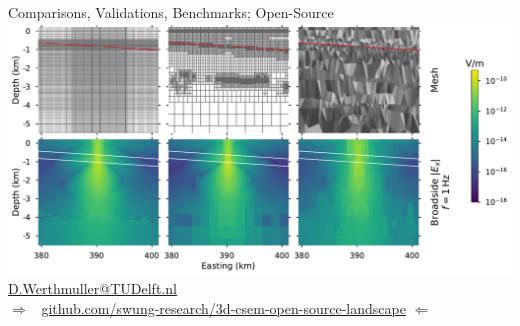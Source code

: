 \documentclass[xcolor=svgnames, aspectratio=169]{beamer}
\newcommand{\bdra}{\ensuremath{\boldsymbol \Rightarrow }~}
\newcommand{\bdla}{\ensuremath{\boldsymbol \Leftarrow }~}
\begin{document}
\begin{frame}
  {Comparisons, Validations, Benchmarks; Open-Source}
  \centering
  \includegraphics[width=.8\textwidth]{results-marlim_survey}\\[.5cm]
  \href{mailto:d.werthmuller@tudelft.nl}{D.Werthmuller@TUDelft.nl}\\
  \alert{\bdra
    \href{https://github.com/swung-research/3d-csem-open-source-landscape}%
         {github.com/swung-research/3d-csem-open-source-landscape}
       \bdla}
\end{frame}
\end{document}
